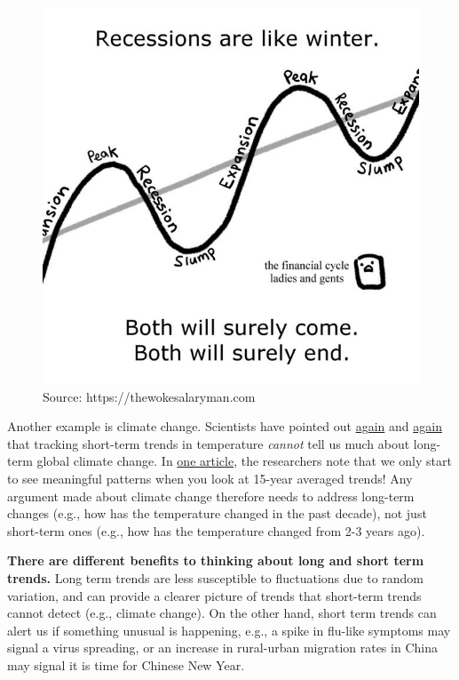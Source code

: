 \documentclass[
  openany]{book}
\begin{document}
\begin{figure}

{\centering \includegraphics[width=0.7\linewidth]{images/yousayisay/recession} 

}

\caption{Source: https://thewokesalaryman.com}\label{fig:recession-tws}
\end{figure}

Another example is climate change. Scientists have pointed out \href{https://www.huffpost.com/entry/nate-silver-climate-change_b_1909482}{again} and \href{http://www.realclimate.org/index.php/archives/2008/01/uncertainty-noise-and-the-art-of-model-data-comparison/}{again} that tracking short-term trends in temperature \emph{cannot} tell us much about long-term global climate change. In \href{http://www.realclimate.org/index.php/archives/2008/01/uncertainty-noise-and-the-art-of-model-data-comparison/}{one article}, the researchers note that we only start to see meaningful patterns when you look at 15-year averaged trends! Any argument made about climate change therefore needs to address long-term changes (e.g., how has the temperature changed in the past decade), not just short-term ones (e.g., how has the temperature changed from 2-3 years ago).

\textbf{There are different benefits to thinking about long and short term trends.} Long term trends are less susceptible to fluctuations due to random variation, and can provide a clearer picture of trends that short-term trends cannot detect (e.g., climate change). On the other hand, short term trends can alert us if something unusual is happening, e.g., a spike in flu-like symptoms may signal a virus spreading, or an increase in rural-urban migration rates in China may signal it is time for Chinese New Year.
\end{document}
